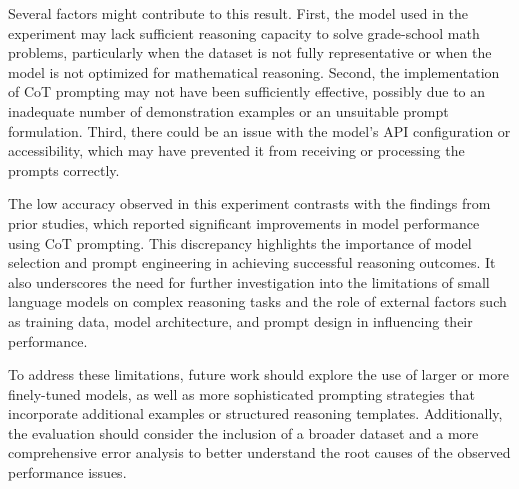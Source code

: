 \documentclass{article}
\begin{document}
Several factors might contribute to this result. First, the model used in the experiment may lack sufficient reasoning capacity to solve grade-school math problems, particularly when the dataset is not fully representative or when the model is not optimized for mathematical reasoning. Second, the implementation of CoT prompting may not have been sufficiently effective, possibly due to an inadequate number of demonstration examples or an unsuitable prompt formulation. Third, there could be an issue with the model's API configuration or accessibility, which may have prevented it from receiving or processing the prompts correctly.

The low accuracy observed in this experiment contrasts with the findings from prior studies, which reported significant improvements in model performance using CoT prompting. This discrepancy highlights the importance of model selection and prompt engineering in achieving successful reasoning outcomes. It also underscores the need for further investigation into the limitations of small language models on complex reasoning tasks and the role of external factors such as training data, model architecture, and prompt design in influencing their performance.

To address these limitations, future work should explore the use of larger or more finely-tuned models, as well as more sophisticated prompting strategies that incorporate additional examples or structured reasoning templates. Additionally, the evaluation should consider the inclusion of a broader dataset and a more comprehensive error analysis to better understand the root causes of the observed performance issues.
\end{document}
